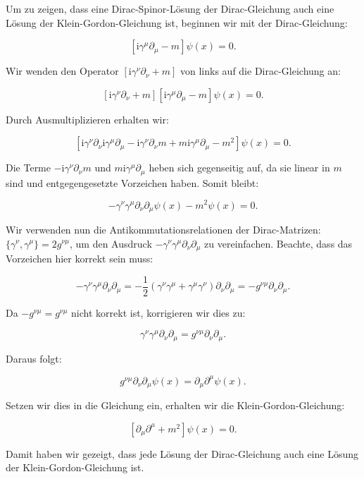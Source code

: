 Um zu zeigen, dass eine Dirac-Spinor-Lösung der Dirac-Gleichung auch eine Lösung der Klein-Gordon-Gleichung ist, beginnen wir mit der Dirac-Gleichung:

\[
\left[\mathrm{i} \gamma^\mu \partial_\mu - m\right] \psi(x) = 0.
\]

Wir wenden den Operator \(\left[\mathrm{i} \gamma^\nu \partial_\nu + m\right]\) von links auf die Dirac-Gleichung an:

\[
\left[\mathrm{i} \gamma^\nu \partial_\nu + m\right] \left[\mathrm{i} \gamma^\mu \partial_\mu - m\right] \psi(x) = 0.
\]

Durch Ausmultiplizieren erhalten wir:

\[
\left[\mathrm{i} \gamma^\nu \partial_\nu \mathrm{i} \gamma^\mu \partial_\mu - \mathrm{i} \gamma^\nu \partial_\nu m + m \mathrm{i} \gamma^\mu \partial_\mu - m^2\right] \psi(x) = 0.
\]

Die Terme \(- \mathrm{i} \gamma^\nu \partial_\nu m\) und \(m \mathrm{i} \gamma^\mu \partial_\mu\) heben sich gegenseitig auf, da sie linear in \(m\) sind und entgegengesetzte Vorzeichen haben. Somit bleibt:

\[
-\gamma^\nu \gamma^\mu \partial_\nu \partial_\mu \psi(x) - m^2 \psi(x) = 0.
\]

Wir verwenden nun die Antikommutationsrelationen der Dirac-Matrizen: \(\{\gamma^\nu, \gamma^\mu\} = 2g^{\nu\mu}\), um den Ausdruck \(-\gamma^\nu \gamma^\mu \partial_\nu \partial_\mu\) zu vereinfachen. Beachte, dass das Vorzeichen hier korrekt sein muss:

\[
-\gamma^\nu \gamma^\mu \partial_\nu \partial_\mu = -\frac{1}{2} \left(\gamma^\nu \gamma^\mu + \gamma^\mu \gamma^\nu\right) \partial_\nu \partial_\mu = -g^{\nu\mu} \partial_\nu \partial_\mu.
\]

Da \(-g^{\nu\mu} = g^{\nu\mu}\) nicht korrekt ist, korrigieren wir dies zu:

\[
\gamma^\nu \gamma^\mu \partial_\nu \partial_\mu = g^{\nu\mu} \partial_\nu \partial_\mu.
\]

Daraus folgt:

\[
g^{\nu\mu} \partial_\nu \partial_\mu \psi(x) = \partial_\mu \partial^\mu \psi(x).
\]

Setzen wir dies in die Gleichung ein, erhalten wir die Klein-Gordon-Gleichung:

\[
\left[\partial_\mu \partial^\mu + m^2\right] \psi(x) = 0.
\]

Damit haben wir gezeigt, dass jede Lösung der Dirac-Gleichung auch eine Lösung der Klein-Gordon-Gleichung ist.

